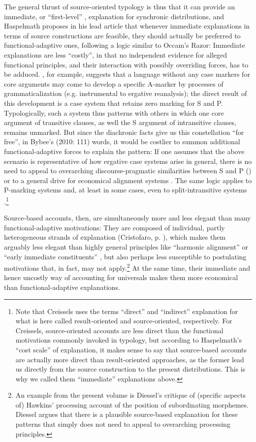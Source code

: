 \documentclass[output=paper]{langsci/langscibook}
\begin{document}
The general thrust of source-oriented typology is thus that it can provide an immediate, or “first-level” \citep[1]{Creissels2008}, explanation for synchronic distributions, and Haspelmath proposes in his lead article that whenever immediate explanations in terms of source constructions are feasible, they should actually be preferred to functional-adaptive ones, following a logic similar to Occam’s Razor: Immediate explanations are less “costly”, in that no independent evidence for alleged functional principles, and their interaction with possibly overriding forces, has to be adduced. \citet{Cristofaro2014}, for example, suggests that a language without any case markers for core arguments may come to develop a specific A-marker by processes of grammaticalization (e.g. instrumental to ergative reanalysis); the direct result of this development is a case system that retains zero marking for S and P. Typologically, such a system thus patterns with others in which one core argument of transitive clauses, as well the S argument of intransitive clauses, remains unmarked. But since the diachronic facts give us this constellation “for free”, in Bybee’s (2010: 111) words, it would be costlier to summon additional functional-adaptive forces to explain the pattern: If one assumes that the above scenario is representative of how ergative case systems arise in general, there is no need to appeal to overarching discourse-pragmatic similarities between S and P (\citealt{DuBois1987}) or to a general drive for economical alignment systems \citep{Comrie1989}. The same logic applies to P-marking systems and, at least in some cases, even to split-intransitive systems \citep{Creissels2008}.\footnote{Note that Creissels uses the terms “direct” and “indirect” explanation for what is here called result-oriented and source-oriented, respectively. For Creissels, source-oriented accounts are less direct than the functional motivations commonly invoked in typology, but according to Haspelmath’s “cost scale” of explanation, it makes sense to say that source-based accounts are actually more direct than result-oriented approaches, as the former lead us directly from the source construction to the present distributions. This is why we called them “immediate” explanations above.} 

Source-based accounts, then, are simultaneously more and less elegant than many functional-adaptive motivations: They are composed of individual, partly heterogeneous strands of explanation (Cristofaro, p. \pageref{p:cristofaro:strands}), which makes them arguably less elegant than highly general principles like “harmonic alignment” \citep{Aissen2003} or “early immediate constituents” \citep{Hawkins1994}, but also perhaps less susceptible to postulating motivations that, in fact, may not apply.\footnote{An example from the present volume is Diessel’s critique of (specific aspects of) Hawkins’ processing account of the position of subordinating morphemes. Diessel argues that there is a plausible source-based explanation for these patterns that simply does not need to appeal to overarching processing principles.} At the same time, their immediate and hence uncostly way of accounting for universals makes them more economical than functional-adaptive explanations. 
\end{document}
